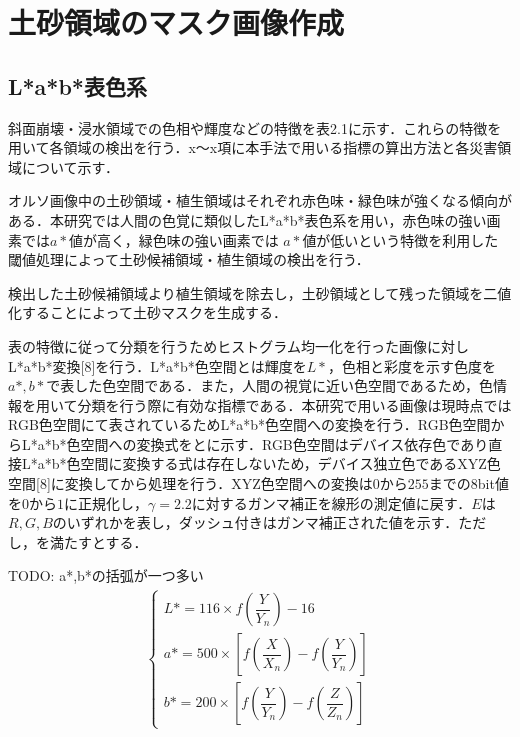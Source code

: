   
  \section{土砂領域のマスク画像作成}
    \label{土砂マスク}
    \subsection{L*a*b*表色系}
    斜面崩壊・浸水領域での色相や輝度などの特徴を表2.1に示す．これらの特徴を用いて各領域の検出を行う．x〜x項に本手法で用いる指標の算出方法と各災害領域について示す．

      オルソ画像中の土砂領域・植生領域はそれぞれ赤色味・緑色味が強くなる傾向がある．本研究では人間の色覚に類似したL*a*b*表色系を用い，赤色味の強い画素では$a*$値が高く，緑色味の強い画素では $a*$値が低いという特徴を利用した閾値処理によって土砂候補領域・植生領域の検出を行う．
      
      検出した土砂候補領域より植生領域を除去し，土砂領域として残った領域を二値化することによって土砂マスクを生成する．
  

      表\tref{}の特徴に従って分類を行うためヒストグラム均一化を行った画像に対しL*a*b*変換[8]を行う．L*a*b*色空間とは輝度を$L*$，色相と彩度を示す色度を$a*,b*$で表した色空間である．また，人間の視覚に近い色空間であるため，色情報を用いて分類を行う際に有効な指標である．本研究で用いる画像は現時点ではRGB色空間にて表されているためL*a*b*色空間への変換を行う．RGB色空間からL*a*b*色空間への変換式をとに示す．RGB色空間はデバイス依存色であり直接L*a*b*色空間に変換する式は存在しないため，デバイス独立色であるXYZ色空間[8]に変換してから処理を行う．XYZ色空間への変換は$0$から$255$までの8bit値を$0$から$1$に正規化し，$γ=2.2$に対するガンマ補正を線形の測定値に戻す．$E$は$R,G,B$のいずれかを表し，ダッシュ付きはガンマ補正された値を示す．ただし，を満たすとする．

      TODO: a*,b*の括弧が一つ多い
      \begin{eqnarray}
      \label{Lab表色系1}
        \left\{
          \begin{array}{l}
            L* = 116 \times f(\dfrac{Y} {Y_{n}}) - 16 \\
            a* = 500 \times [f(\dfrac{X} {X_{n}}) - f(\dfrac{Y} {Y_{n}})] \\
            b* = 200 \times [f(\dfrac{Y} {Y_{n}}) - f(\dfrac{Z} {Z_{n}})]
          \end{array}
        \right.
      \end{eqnarray}

